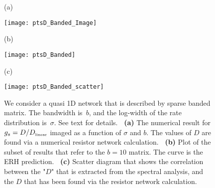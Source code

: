 \documentclass[onecolumn,fleqn,12pt,openany,draft]{book}
\newcommand{\tbox}[1]{\mbox{\tiny #1}}
\newcommand{\mpg}[2][1.0\hsize]{\begin{minipage}[b]{#1}{#2}\end{minipage}}
\newcommand{\hide}[1]{}
\begin{document}
\hide{
\begin{figure}[H]

\texttt{[image: ptsD\_lattice]}

\caption{The diffusion coefficient for the 2D lattice model. 
The dots are determined from the spectral analysis.
The lines are the ERH estimate. The thick line and its 
corresponding dots are for a network whose $\epsilon$ 
has uniform distribution within ${[0,\sigma]}$. 
The thin line and its corresponding dots are for 
a modified distribution that has same median. 
See text for details. The ERH estimate is sensitive 
enough to discriminate the two networks.
}
\label{f3}
\end{figure}
}


\begin{figure}[H]

\mpg[2cm]{(a) \\ \vspace*{2cm}} 
\texttt{[image: ptsD\_Banded\_Image]}

\mpg[2cm]{(b) \\ \vspace*{4cm}} 
\texttt{[image: ptsD\_Banded]}

\mpg[2cm]{(c) \\ \vspace*{4cm}} 
\texttt{[image: ptsD\_Banded\_scatter]}

\caption{
We consider a quasi 1D network that is described 
by sparse banded matrix. The bandwidth is~$b$, 
and the log-width of the rate distribution is~$\sigma$.  
See text for details.
%
{\bf \ (a)} The numerical result for $g_s=D/D_{\tbox{linear}}$ 
imaged as a function of $\sigma$ and $b$.
The values of $D$ are found via a numerical 
resistor network calculation.  
%
{\bf \ (b)} Plot of the subset of results that 
refer to the $b=10$ matrix. 
The curve is the ERH prediction. 
%
{\bf \ (c)} Scatter diagram that shows 
the correlation between the "$D$" that is extracted 
from the spectral analysis, and the $D$ that  
has been found via the resistor network calculation.}
\label{f4}
\end{figure}




\end{document}
